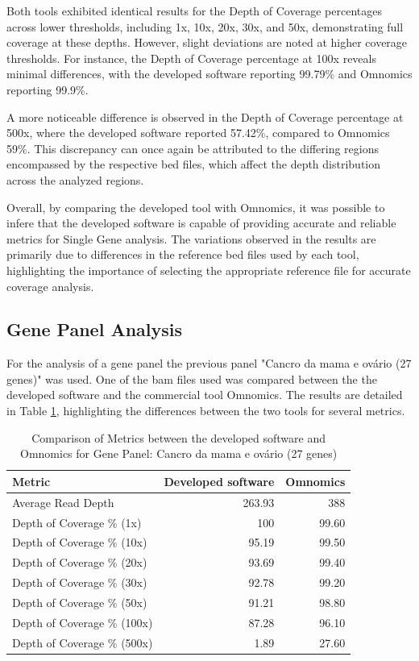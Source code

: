 Both tools exhibited identical results for the Depth of Coverage percentages across lower thresholds, including 1x, 10x, 20x, 30x, and 50x, demonstrating full coverage at these depths. However, slight deviations are noted at higher coverage thresholds. For instance, the Depth of Coverage percentage at 100x reveals minimal differences, with the developed software reporting 99.79\% and Omnomics reporting 99.9\%.

A more noticeable difference is observed in the Depth of Coverage percentage at 500x, where the developed software reported 57.42\%, compared to Omnomics 59\%. This discrepancy can once again be attributed to the differing regions encompassed by the respective \ac{bed} files, which affect the depth distribution across the analyzed regions.

Overall, by comparing the developed tool with Omnomics, it was possible to infere that the developed software is capable of providing accurate and reliable metrics for Single Gene analysis. The variations observed in the results are primarily due to differences in the reference \ac{bed} files used by each tool, highlighting the importance of selecting the appropriate reference file for accurate coverage analysis.

\subsection{Gene Panel Analysis}

For the analysis of a gene panel the previous panel "Cancro da mama e ovário (27 genes)" was used. One of the \ac{bam} files used was compared between the the developed software and the commercial tool Omnomics. The results are detailed in Table \ref{tab:panel_omnomicsVSunilabs}, highlighting the differences between the two tools for several metrics.

\begin{table}[H]
    \centering
    \caption{Comparison of Metrics between the developed software and Omnomics for Gene Panel: Cancro da mama e ovário (27 genes)}
    \label{tab:panel_omnomicsVSunilabs}
    \begin{tabular}{lrr}
    \textbf{Metric}                      & \textbf{Developed software} & \textbf{Omnomics} \\ \hline
    Average Read Depth          & 263.93           & 388      \\
    Depth of Coverage \% (1x)   & 100              & 99.60     \\
    Depth of Coverage \% (10x)  & 95.19            & 99.50     \\
    Depth of Coverage \% (20x)  & 93.69            & 99.40     \\
    Depth of Coverage \% (30x)  & 92.78            & 99.20     \\
    Depth of Coverage \% (50x)  & 91.21            & 98.80     \\
    Depth of Coverage \% (100x) & 87.28            & 96.10     \\
    Depth of Coverage \% (500x) & 1.89             & 27.60    
    \end{tabular}
    \end{table}
    
